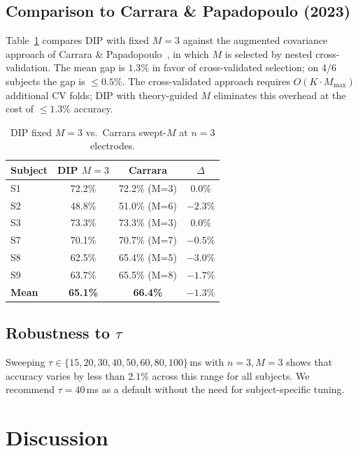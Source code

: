 \documentclass[journal]{IEEEtran}
\begin{document}
\subsection{Comparison to Carrara \& Papadopoulo (2023)}
\label{sec:carrara}

Table~\ref{tab:carrara} compares DIP with fixed $M=3$ against the augmented covariance approach of Carrara \& Papadopoulo~\cite{carrara2023}, in which $M$ is selected by nested cross-validation. The mean gap is $1.3\%$ in favor of cross-validated selection; on 4/6 subjects the gap is $\leq 0.5\%$. The cross-validated approach requires $O(K \cdot M_{\max})$ additional CV folds; DIP with theory-guided $M$ eliminates this overhead at the cost of $\leq 1.3\%$ accuracy.

\begin{table}[t]
\centering
\caption{DIP fixed $M=3$ vs.\ Carrara swept-$M$ at $n=3$ electrodes.}
\label{tab:carrara}
\begin{tabular}{lccc}
\toprule
Subject & DIP $M=3$ & Carrara & $\Delta$ \\
\midrule
S1 & 72.2\% & 72.2\% (M=3) & 0.0\% \\
S2 & 48.8\% & 51.0\% (M=6) & $-2.3\%$ \\
S3 & 73.3\% & 73.3\% (M=3) & 0.0\% \\
S7 & 70.1\% & 70.7\% (M=7) & $-0.5\%$ \\
S8 & 62.5\% & 65.4\% (M=5) & $-3.0\%$ \\
S9 & 63.7\% & 65.5\% (M=8) & $-1.7\%$ \\
\midrule
\textbf{Mean} & \textbf{65.1\%} & \textbf{66.4\%} & $-1.3\%$ \\
\bottomrule
\end{tabular}
\end{table}

\subsection{Robustness to $\tau$}
Sweeping $\tau \in \{15, 20, 30, 40, 50, 60, 80, 100\}$\,ms with $n=3, M=3$ shows that accuracy varies by less than $2.1\%$ across this range for all subjects. We recommend $\tau = 40$\,ms as a default without the need for subject-specific tuning.

\section{Discussion}
\label{sec:discussion}
\end{document}
